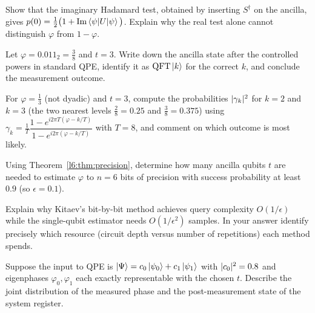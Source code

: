 \begin{exercise}
Show that the imaginary Hadamard test, obtained by inserting $S^{\dagger}$ on
the ancilla, gives $p(0)=\tfrac12\big(1+\mathrm{Im}\braket{\psi|U|\psi}\big)$.
Explain why the real test alone cannot distinguish $\varphi$ from $1-\varphi$.
\end{exercise}

\begin{exercise}
Let $\varphi=0.011_2=\tfrac38$ and $t=3$. Write down the ancilla state after the
controlled powers in standard QPE, identify it as $\mathrm{QFT}\ket{k}$ for the correct
$k$, and conclude the measurement outcome.
\end{exercise}

\begin{exercise}
For $\varphi=\tfrac13$ (not dyadic) and $t=3$, compute the probabilities
$\lvert\gamma_{k}\rvert^{2}$ for $k=2$ and $k=3$ (the two nearest levels
$\tfrac28=0.25$ and $\tfrac38=0.375$) using
$\gamma_{k}=\tfrac1T\dfrac{1-e^{i2\pi T(\varphi-k/T)}}{1-e^{i2\pi(\varphi-k/T)}}$
with $T=8$, and comment on which outcome is most likely.
\end{exercise}

\begin{exercise}
Using Theorem~\ref{l6:thm:precision}, determine how many ancilla qubits $t$ are
needed to estimate $\varphi$ to $n=6$ bits of precision with success
probability at least $0.9$ (so $\epsilon=0.1$).
\end{exercise}

\begin{exercise}
Explain why Kitaev's bit-by-bit method achieves query complexity
$O(1/\epsilon)$ while the single-qubit estimator needs $O(1/\epsilon^{2})$
samples. In your answer identify precisely which resource (circuit depth versus
number of repetitions) each method spends.
\end{exercise}

\begin{exercise}
Suppose the input to QPE is $\ket{\Psi}=c_{0}\ket{\psi_{0}}+c_{1}\ket{\psi_{1}}$
with $\lvert c_{0}\rvert^{2}=0.8$ and eigenphases $\varphi_{0},\varphi_{1}$ each
exactly representable with the chosen $t$. Describe the joint distribution of
the measured phase and the post-measurement state of the system register.
\end{exercise}

